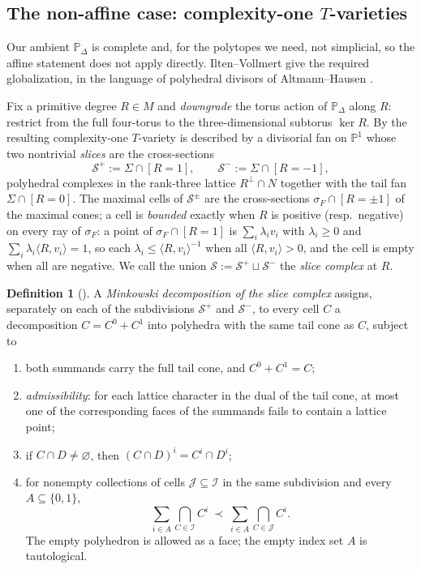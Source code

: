 \documentclass[11pt]{amsart}
\theoremstyle{definition}
\newtheorem{definition}[theorem]{Definition}
\theoremstyle{remark}
\theoremstyle{plain}
\newcommand{\PP}{\mathbb{P}}
\newcommand{\cS}{\mathcal{S}}
\begin{document}
\subsection{The non-affine case: complexity-one \texorpdfstring{$T$}{T}-varieties}
Our ambient $\PP_\Delta$ is complete and, for the polytopes we need, not
simplicial, so the affine statement does not apply directly.  Ilten--Vollmert
\cite{IV12} give the required globalization, in the language of polyhedral
divisors of Altmann--Hausen \cite{AH06,AHS08}.

Fix a primitive degree $R \in M$ and \emph{downgrade} the torus action of
$\PP_\Delta$ along $R$: restrict from the full four-torus to the
three-dimensional subtorus $\ker R$.  By \cite[Rem.~1.8]{IV12} the resulting
complexity-one $T$-variety is described by a divisorial fan on $\PP^1$ whose
two nontrivial \emph{slices} are the cross-sections
\begin{equation}\label{eq:slices}
  \cS^{+} := \Sigma \cap [R = 1], \qquad \cS^{-} := \Sigma \cap [R = -1],
\end{equation}
polyhedral complexes in the rank-three lattice $R^\perp \cap N$ together with
the tail fan $\Sigma \cap [R=0]$.  The maximal cells of $\cS^{\pm}$ are the
cross-sections $\sigma_F \cap [R = \pm 1]$ of the maximal cones; a cell is
\emph{bounded} exactly when $R$ is positive (resp.\ negative) on every ray of
$\sigma_F$: a point of $\sigma_F\cap[R=1]$ is $\sum_i\lambda_iv_i$ with
$\lambda_i\ge0$ and $\sum_i\lambda_i\langle R,v_i\rangle=1$, so each
$\lambda_i\le\langle R,v_i\rangle^{-1}$ when all $\langle R,v_i\rangle>0$, and
the cell is empty when all are negative.  We call the union $\cS := \cS^+ \sqcup \cS^-$ the \emph{slice
complex} at $R$.

\begin{definition}[{\cite[Def.~2.1, 2.2, 4.1]{IV12}}]\label{def:iv}
A \emph{Minkowski decomposition of the slice complex} assigns, separately on
each of the subdivisions $\cS^+$ and $\cS^-$, to every cell $C$ a decomposition
$C=C^0+C^1$ into polyhedra with the same tail cone as $C$, subject to
\begin{enumerate}
\item[(D1)] both summands carry the full tail cone, and $C^0 + C^1 = C$;
\item[(D2)] \emph{admissibility}: for each lattice character in the dual of the
  tail cone, at most one of the corresponding faces of the summands fails to
  contain a lattice point;
\item[(D3)] if $C\cap D\ne\varnothing$, then
  $(C\cap D)^i=C^i\cap D^i$;
\item[(D4)] for nonempty collections of cells
  $\mathcal J\subseteq\mathcal I$ in the same subdivision and every
  $A\subseteq\{0,1\}$,
  \[
    \sum_{i\in A}\bigcap_{C\in\mathcal I}C^i
    \ \prec\
    \sum_{i\in A}\bigcap_{C\in\mathcal J}C^i.
  \]
  The empty polyhedron is allowed as a face; the empty index set $A$ is
  tautological.
\end{enumerate}
\end{definition}
\end{document}

